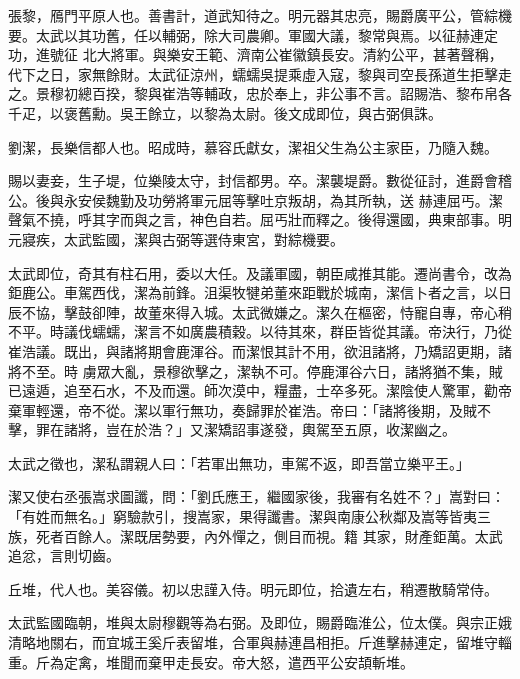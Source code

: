 \begin{pinyinscope}
 張黎，鴈門平原人也。善書計，道武知待之。明元器其忠亮，賜爵廣平公，管綜機要。太武以其功舊，任以輔弼，除大司農卿。軍國大議，黎常與焉。以征赫連定功，進號征
 北大將軍。與樂安王範、濟南公崔徽鎮長安。清約公平，甚著聲稱，代下之日，家無餘財。太武征涼州，蠕蠕吳提乘虛入寇，黎與司空長孫道生拒擊走之。景穆初總百揆，黎與崔浩等輔政，忠於奉上，非公事不言。詔賜浩、黎布帛各千疋，以褒舊勳。吳王餘立，以黎為太尉。後文成即位，與古弼俱誅。



 劉潔，長樂信都人也。昭成時，慕容氏獻女，潔祖父生為公主家臣，乃隨入魏。



 賜以妻妾，生子堤，位樂陵太守，封信都男。卒。潔襲堤爵。數從征討，進爵會稽公。後與永安侯魏勤及功勞將軍元屈等擊吐京叛胡，為其所執，送
 赫連屈丐。潔聲氣不撓，呼其字而與之言，神色自若。屈丐壯而釋之。後得還國，典東部事。明元寢疾，太武監國，潔與古弼等選侍東宮，對綜機要。



 太武即位，奇其有柱石用，委以大任。及議軍國，朝臣咸推其能。遷尚書令，改為鉅鹿公。車駕西伐，潔為前鋒。沮渠牧犍弟董來距戰於城南，潔信卜者之言，以日辰不協，擊鼓卻陣，故董來得入城。太武微嫌之。潔久在樞密，恃寵自專，帝心稍不平。時議伐蠕蠕，潔言不如廣農積穀。以待其來，群臣皆從其議。帝決行，乃從崔浩議。既出，與諸將期會鹿渾谷。而潔恨其計不用，欲沮諸將，乃矯詔更期，諸將不至。時
 虜眾大亂，景穆欲擊之，潔執不可。停鹿渾谷六日，諸將猶不集，賊已遠遁，追至石水，不及而還。師次漠中，糧盡，士卒多死。潔陰使人驚軍，勸帝棄軍輕還，帝不從。潔以軍行無功，奏歸罪於崔浩。帝曰：「諸將後期，及賊不擊，罪在諸將，豈在於浩？」又潔矯詔事遂發，輿駕至五原，收潔幽之。



 太武之徵也，潔私謂親人曰：「若軍出無功，車駕不返，即吾當立樂平王。」



 潔又使右丞張嵩求圖讖，問：「劉氏應王，繼國家後，我審有名姓不？」嵩對曰：「有姓而無名。」窮驗款引，搜嵩家，果得讖書。潔與南康公秋鄰及嵩等皆夷三族，死者百餘人。潔既居勢要，內外憚之，側目而視。籍
 其家，財產鉅萬。太武追忿，言則切齒。



 丘堆，代人也。美容儀。初以忠謹入侍。明元即位，拾遺左右，稍遷散騎常侍。



 太武監國臨朝，堆與太尉穆觀等為右弼。及即位，賜爵臨淮公，位太僕。與宗正娥清略地關右，而宜城王奚斤表留堆，合軍與赫連昌相拒。斤進擊赫連定，留堆守輜重。斤為定禽，堆聞而棄甲走長安。帝大怒，遣西平公安頡斬堆。




\end{pinyinscope}
